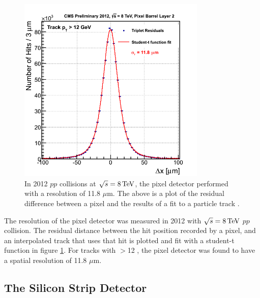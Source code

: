 \begin{figure}[h]
   \centering
  \includegraphics[width=0.8\textwidth]{Figures/CMS_Diagrams/Tracker__Pixel_Resolution__2012_data.png}
  \caption{In 2012 $pp$ collisions at $\sqrt{s}=8 \,\text{Te\hspace{-.08em}V}$, the pixel
    detector performed with a resolution of 11.8 $\mu$m.  The above
    is a plot of the residual difference between a pixel and the
    results of a fit to a particle track \cite{CMS:tracker_pixels_resolution}.} \label{fig:tracker_pixel_resolution}
\end{figure}

\par The resolution of the pixel detector was measured in 2012 with
$\sqrt{s}=8 \,\text{Te\hspace{-.08em}V}$ $pp$ collision.  The residual distance between the
hit position recorded by a pixel, and an interpolated track that uses
that hit is plotted and fit with a student-t function in figure
\ref{fig:tracker_pixel_resolution}.  For tracks with \PT$>$12 \GeV, the
pixel detector was found to have a spatial resolution of 11.8 $\mu$m. 


\subsection{The Silicon Strip Detector}
\label{tracker_strip_description}

